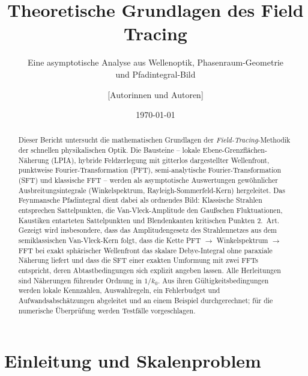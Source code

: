 \documentclass[11pt,a4paper]{scrartcl}
\title{\textbf{Theoretische Grundlagen des Field Tracing}}
\subtitle{Eine asymptotische Analyse aus Wellenoptik, Phasenraum-Geometrie\\ und Pfadintegral-Bild}
\author{[Autorinnen und Autoren]}
\date{\today}
\theoremstyle{insightstyle}
\begin{document}
\maketitle

\begin{abstract}
\noindent
Dieser Bericht untersucht die mathematischen Grundlagen der \emph{Field-Tracing}-Methodik der schnellen physikalischen Optik. Die Bausteine -- lokale Ebene-Grenzflächen-Näherung (LPIA), hybride Feldzerlegung mit gitterlos dargestellter Wellenfront, punktweise Fourier-Transformation (PFT), semi-analytische Fourier-Transformation (SFT) und klassische FFT -- werden als asymptotische Auswertungen gewöhnlicher Ausbreitungsintegrale (Winkelspektrum, Rayleigh-Sommerfeld-Kern) hergeleitet. Das Feynmansche Pfadintegral dient dabei als ordnendes Bild: Klassische Strahlen entsprechen Sattelpunkten, die Van-Vleck-Amplitude den Gaußschen Fluktuationen, Kaustiken entarteten Sattelpunkten und Blendenkanten kritischen Punkten 2.~Art. Gezeigt wird insbesondere, dass das Amplitudengesetz des Strahlennetzes aus dem semiklassischen Van-Vleck-Kern folgt, dass die Kette PFT $\to$ Winkelspektrum $\to$ FFT bei exakt sphärischer Wellenfront das skalare Debye-Integral ohne paraxiale Näherung liefert und dass die SFT einer exakten Umformung mit zwei FFTs entspricht, deren Abtastbedingungen sich explizit angeben lassen. Alle Herleitungen sind Näherungen führender Ordnung in $1/k_0$. Aus ihren Gültigkeitsbedingungen werden lokale Kennzahlen, Auswahlregeln, ein Fehlerbudget und Aufwandsabschätzungen abgeleitet und an einem Beispiel durchgerechnet; für die numerische Überprüfung werden Testfälle vorgeschlagen.
\end{abstract}

\tableofcontents
\newpage

\section{Einleitung und Skalenproblem}
\end{document}
